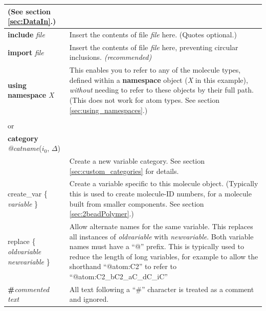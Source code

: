 \documentclass[11pt]{article}
\begin{document}
\begin{longtable}[h]{l|p{9cm}}
{(See section \ref{sec:DataIn}.)
}
\\
\hline
\textbf{include} \textit{file}
&
Insert the contents of file \textit{file} here. (Quotes optional.)
\\
\hline
\textbf{import} \textit{file}
&
Insert the contents of file \textit{file} here,
preventing circular inclusions.
\textit{(recommended)}
\\
\hline
\textbf{using namespace} \textit{X}
&
This enables you to refer to any of the molecule types,
defined within a \textbf{namespace} object (\textit{X} in this example),
\textit{without} needing to refer to these objects by their full path.
(This does not work for atom types.
See section \ref{sec:using_namespaces}.)
\\
\hline
\begin{tabular}[t]{l}
\textbf{category} \textit{\$catname}($i_0$, $\Delta$)
\\
or \\
\textbf{category} \textit{@catname}($i_0$, $\Delta$)
\\
\end{tabular}
&
Create a new variable category.
See section \ref{sec:custom_categories} for details.
\\
\hline
create\_var \{ \textit{variable} \} &
Create a variable specific to this molecule object. 
(Typically this is used to create molecule-ID numbers, 
for a molecule built from smaller components.
See section \ref{sec:2beadPolymer}.)
\\
\hline
replace \{ \textit{oldvariable} \textit{newvariable} \} &
Allow alternate names for the same variable.  This replaces all instances of \textit{oldvariable} with \textit{newvariable}.  Both variable names must have a ``@'' prefix.  This is typically used to reduce the length of long variables, for example to allow the shorthand ``@atom:C2'' to refer to ``@atom:C2\_bC2\_aC\_dC\_iC''
\\
\hline
 \textbf{\#}\textit{commented text} & 
All text following a ``\#'' character is treated as a comment and ignored.
\end{longtable}

\end{document}
